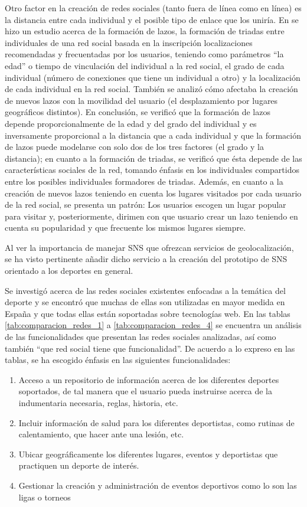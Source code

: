 Otro factor en la creación de redes sociales (tanto fuera de línea como en línea) es la distancia entre cada individual y el posible tipo de enlace que los uniría. En \cite{evolution} se hizo un estudio acerca de la formación de lazos, la formación de triadas entre individuales de una red social basada en la inscripción localizaciones recomendadas y frecuentadas por los usuarios, teniendo como parámetros “la edad” o tiempo de vinculación del individual a la red social, el grado de cada individual (número de conexiones que tiene un individual a otro) y la localización de cada individual en la red social. También se analizó cómo afectaba la creación de nuevos lazos con la movilidad del usuario (el desplazamiento por lugares geográficos distintos). En conclusión, se verificó que la formación de lazos depende proporcionalmente de la edad y del grado del individual y es inversamente proporcional a la distancia que a cada individual y que la formación de lazos puede modelarse con solo dos de los tres factores (el grado y la distancia); en cuanto a la formación de triadas, se verificó que ésta depende de las características sociales de la red, tomando énfasis en los individuales compartidos entre los posibles individuales formadores de triadas. Además, en cuanto a la creación de nuevos lazos teniendo en cuenta los lugares visitados por cada usuario de la red social, se presenta un patrón: Los usuarios escogen un lugar popular para visitar y, posteriormente, dirimen con que usuario crear un lazo teniendo en cuenta su popularidad y que frecuente los mismos lugares siempre.

Al ver la importancia de manejar SNS que ofrezcan servicios de geolocalización, se ha visto pertinente añadir dicho servicio a la creación del prototipo de SNS orientado a los deportes en general.

Se investigó acerca de las redes sociales existentes enfocadas a la temática del deporte y se encontró que muchas de ellas son utilizadas en mayor medida en España y que todas ellas están soportadas sobre tecnologías web. En las tablas \ref{tab:comparacion_redes_1} a \ref{tab:comparacion_redes_4} se encuentra un análisis de las funcionalidades que presentan las redes sociales analizadas, así como también “que red social tiene que funcionalidad”. De acuerdo a lo expreso en las tablas, se ha escogido énfasis en las siguientes funcionalidades:

\begin{enumerate}
  \item Acceso a un repositorio de información acerca de los diferentes deportes soportados, de tal manera que el usuario pueda instruirse acerca de la indumentaria necesaria, reglas, historia, etc.
  \item Incluir información de salud para los diferentes deportistas, como rutinas de calentamiento, que hacer ante una lesión, etc. 
  \item Ubicar geográficamente los diferentes lugares, eventos y deportistas que practiquen un deporte de interés.
  \item Gestionar la creación y administración de eventos deportivos como lo son las ligas o torneos
\end{enumerate}

